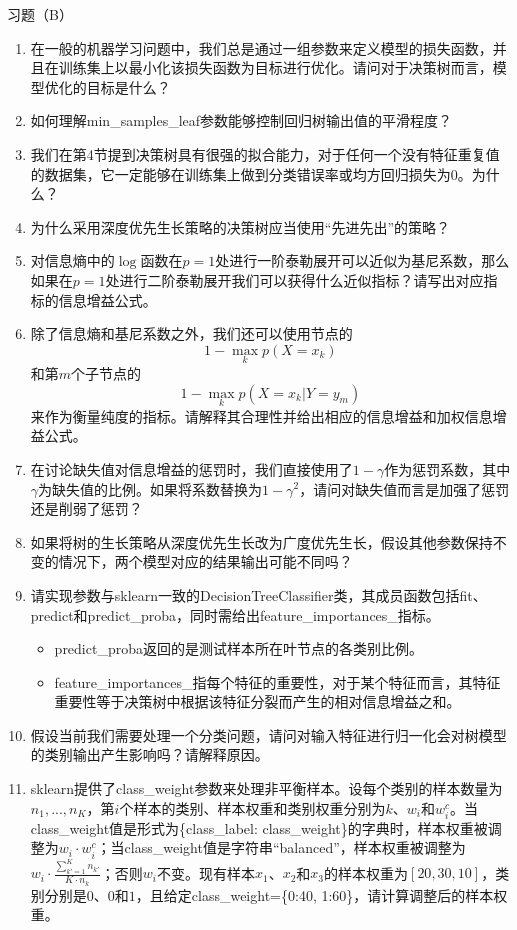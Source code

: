 \documentclass{ctexbeamer}        %
\begin{document}
\begin{frame}[allowframebreaks]{习题（B）}
\begin{enumerate}
\item 在一般的机器学习问题中，我们总是通过一组参数来定义模型的损失函数，并且在训练集上以最小化该损失函数为目标进行优化。请问对于决策树而言，模型优化的目标是什么？
\item 如何理解min\_samples\_leaf参数能够控制回归树输出值的平滑程度？
\item 我们在第4节提到决策树具有很强的拟合能力，对于任何一个没有特征重复值的数据集，它一定能够在训练集上做到分类错误率或均方回归损失为0。为什么？
\item 为什么采用深度优先生长策略的决策树应当使用“先进先出”的策略？
\framebreak
\item 对信息熵中的$\log$函数在$p=1$处进行一阶泰勒展开可以近似为基尼系数，那么如果在$p=1$处进行二阶泰勒展开我们可以获得什么近似指标？请写出对应指标的信息增益公式。
\item 除了信息熵和基尼系数之外，我们还可以使用节点的$$1-\max_{k}p(X=x_k)$$和第$m$个子节点的$$1-\max_{k}p(X=x_k\vert Y=y_m)$$来作为衡量纯度的指标。请解释其合理性并给出相应的信息增益和加权信息增益公式。
\framebreak
\item 在讨论缺失值对信息增益的惩罚时，我们直接使用了$1-\gamma$作为惩罚系数，其中$\gamma$为缺失值的比例。如果将系数替换为$1-\gamma^2$，请问对缺失值而言是加强了惩罚还是削弱了惩罚？
\item 如果将树的生长策略从深度优先生长改为广度优先生长，假设其他参数保持不变的情况下，两个模型对应的结果输出可能不同吗？
\item 请实现参数与sklearn一致的DecisionTreeClassifier类，其成员函数包括fit、predict和predict\_proba，同时需给出feature\_importances\_指标。
\begin{itemize}
\item predict\_proba返回的是测试样本所在叶节点的各类别比例。
\item feature\_importances\_指每个特征的重要性，对于某个特征而言，其特征重要性等于决策树中根据该特征分裂而产生的相对信息增益之和。
\end{itemize}
\framebreak
\item 假设当前我们需要处理一个分类问题，请问对输入特征进行归一化会对树模型的类别输出产生影响吗？请解释原因。
\item sklearn提供了class\_weight参数来处理非平衡样本。设每个类别的样本数量为$n_1,...,n_K$，第$i$个样本的类别、样本权重和类别权重分别为$k$、$w_i$和$w^c_i$。当class\_weight值是形式为\{class\_label: class\_weight\}的字典时，样本权重被调整为$w_i\cdot w^c_i$；当class\_weight值是字符串“balanced”，样本权重被调整为$w_i\cdot \frac{\sum_{k'=1}^K n_{k'}}{K\cdot n_k}$；否则$w_i$不变。现有样本$x_1$、$x_2$和$x_3$的样本权重为$[20,30,10]$，类别分别是$0$、$0$和$1$，且给定class\_weight=\{0:40, 1:60\}，请计算调整后的样本权重。

\end{enumerate}
\end{frame}
\end{document}
